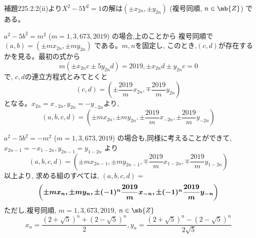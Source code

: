 補題225.2.2(ii)より$X^2-5Y^2=1$の解は$(\pm x_{2n}, \pm y_{2n})$ (複号同順, $n\in \mb{Z}$) である。

$a^2-5b^2=m^2$ ($m=1,3,673,2019$) の場合,上のことから 複号同順で$(a,b)=(\pm mx_{2n}, \pm my_{2n})$ である。$m,n$を固定し, このとき,$(c,d)$が存在するかを見る。最初の式から
\[m(\pm x_{2n}c \pm 5y_{2n}d)=2019,　　\pm x_{2n}d\pm y_{2n}c=0\]
で, $c,d$の連立方程式とみてとくと
\[(c,d)=(\pm\dfrac{2019}{m}x_{2n}, \mp\dfrac{2019}{m}y_{2n})\]
 となる。$x_{2n}=x_{-2n},　y_{2n}=-y_{-2n}$より,
\[(a,b,c,d)=\left(\pm mx_{2n}, \pm my_{2n}, \pm\dfrac{2019}{m}x_{-2n}, \pm\dfrac{2019}{m}y_{-2n}\right)\]

$a^2-5b^2=-m^2$ ($m=1,3,673,2019$) の場合も,同様に考えることができて, $x_{2n-1}=-x_{1-2n},　y_{2n-1}=y_{1-2n}$ より
\[(a,b,c,d)=\left(\pm mx_{2n-1}, \pm my_{2n-1}, \mp\dfrac{2019}{m}x_{1-2n}, \mp\dfrac{2019}{m}y_{1-2n}\right)\]
以上より, 求める組のすべては, $(a,b,c,d)=$
\[\mbox{{\boldmath $\left(\pm mx_{n}, \pm my_{n}, \pm (-1)^n\dfrac{2019}{m}x_{-n}, \pm (-1)^n\dfrac{2019}{m}y_{-n}\right)$}}\]
ただし,複号同順, $m=1,3,673,2019$, $n\in\mb{Z}$
\[x_n=\dfrac{(2+\sqrt{5})^n+(2-\sqrt{5})^n}{2},　y_n=\dfrac{(2+\sqrt{5})^n-(2-\sqrt{5})^n}{2\sqrt{5}}\]
